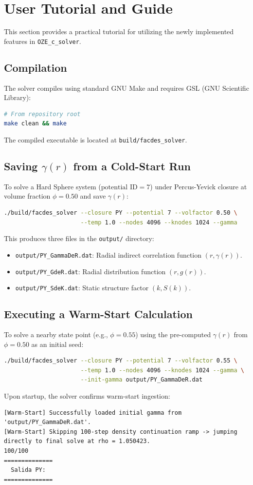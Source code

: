 \documentclass[11pt,a4paper]{article}
\begin{document}
\section{User Tutorial and Guide}

This section provides a practical tutorial for utilizing the newly implemented features in \texttt{OZE\_c\_solver}.

\subsection{Compilation}
The solver compiles using standard GNU Make and requires GSL (GNU Scientific Library):
\begin{lstlisting}[language=bash]
# From repository root
make clean && make
\end{lstlisting}
The compiled executable is located at \texttt{build/facdes\_solver}.

\subsection{Saving $\gamma(r)$ from a Cold-Start Run}
To solve a Hard Sphere system ($\text{potential ID} = 7$) under Percus-Yevick closure at volume fraction $\phi = 0.50$ and save $\gamma(r)$:
\begin{lstlisting}[language=bash]
./build/facdes_solver --closure PY --potential 7 --volfactor 0.50 \
                      --temp 1.0 --nodes 4096 --knodes 1024 --gamma
\end{lstlisting}
This produces three files in the \texttt{output/} directory:
\begin{itemize}
    \item \texttt{output/PY\_GammaDeR.dat}: Radial indirect correlation function $(r, \gamma(r))$.
    \item \texttt{output/PY\_GdeR.dat}: Radial distribution function $(r, g(r))$.
    \item \texttt{output/PY\_SdeK.dat}: Static structure factor $(k, S(k))$.
\end{itemize}

\subsection{Executing a Warm-Start Calculation}
To solve a nearby state point (e.g., $\phi = 0.55$) using the pre-computed $\gamma(r)$ from $\phi = 0.50$ as an initial seed:
\begin{lstlisting}[language=bash]
./build/facdes_solver --closure PY --potential 7 --volfactor 0.55 \
                      --temp 1.0 --nodes 4096 --knodes 1024 --gamma \
                      --init-gamma output/PY_GammaDeR.dat
\end{lstlisting}
Upon startup, the solver confirms warm-start ingestion:
\begin{lstlisting}
[Warm-Start] Successfully loaded initial gamma from 'output/PY_GammaDeR.dat'.
[Warm-Start] Skipping 100-step density continuation ramp -> jumping directly to final solve at rho = 1.050423.
100/100
==============
  Salida PY:
==============
\end{lstlisting}
\end{document}
